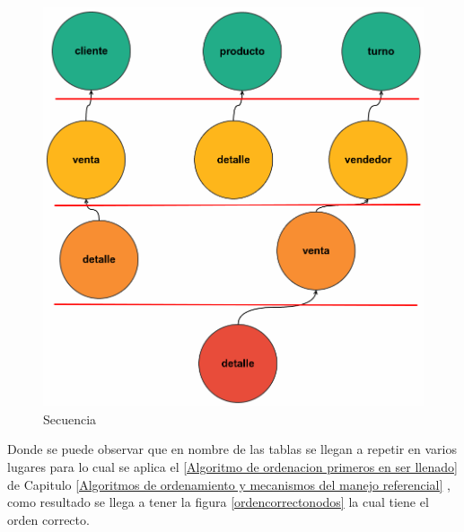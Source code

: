 \begin{figure}[H]
\centering
\includegraphics[scale=0.2]{images/desordenadocomp.png}
\caption{Secuencia}
\label{desodenadocomp}
\end{figure}
Donde se puede observar que en nombre de las tablas se llegan a repetir en varios lugares para lo cual se aplica el \ref{Algoritmo de ordenacion primeros en ser llenado} de Capitulo \ref{Algoritmos de ordenamiento y mecanismos del manejo referencial} , como resultado se llega a tener la figura \ref{ordencorrectonodos} la cual tiene el orden correcto.
